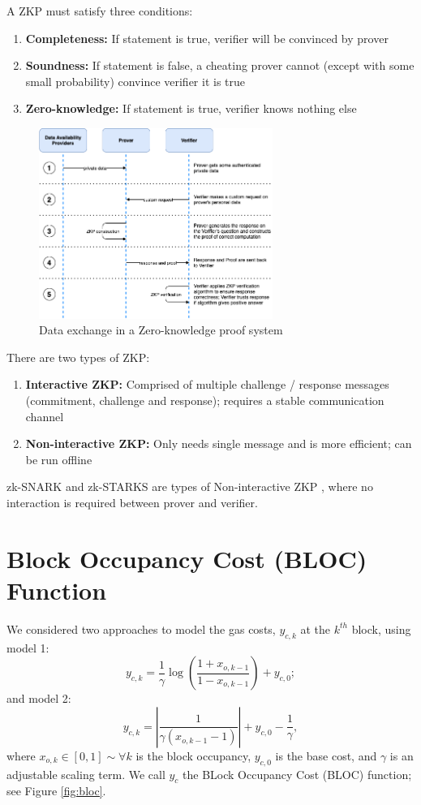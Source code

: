 \documentclass[peerreview]{ieeesyscoin}
\begin{document}
A ZKP must satisfy three conditions:

\begin{enumerate}
\item \textbf{Completeness:} If statement is true, verifier will be convinced by prover
\item\textbf{Soundness:} If statement is false, a cheating prover cannot (except with some small probability) convince verifier it is true
\item \textbf{Zero-knowledge:} If statement is true, verifier knows nothing else
\end{enumerate}

\begin{figure}[h!]
\includegraphics[width=3in]{img/zkp.png}
\caption{Data exchange in a Zero-knowledge proof system} 
\label{fig:zkp}
\end{figure} 

There are two types of ZKP:

\begin{enumerate}
\item \textbf{Interactive ZKP:} Comprised of multiple challenge / response messages (commitment, challenge and response); requires a stable communication channel
\item \textbf{Non-interactive ZKP:} Only needs single message and is more efficient; can be run offline
\end{enumerate}
zk-SNARK and zk-STARKS are types of Non-interactive ZKP , where no interaction is required between prover and verifier.

\section{Block Occupancy Cost (BLOC) Function}

We considered two approaches to model the gas costs, $y_{c,k}$ at the $k^{th}$ block, using model 1:
\begin{equation}
y_{c,k} = \dfrac{1}{\gamma}\log\left(\dfrac{1+x_{o,k-1}}{1-x_{o,k-1}}\right) + y_{c,0};
\end{equation}
and model 2:
\begin{equation}
y_{c,k} = \left| \dfrac{1}{\gamma(x_{o,k-1}-1)} \right| + y_{c,0} - \dfrac{1}{\gamma},
\end{equation}
where $x_{o,k} \in [0,1] \sim \forall k$ is the block occupancy, $y_{c,0}$ is the base cost, and $\gamma$ is an adjustable scaling term. We call $y_{c}$ the BLock Occupancy Cost (BLOC) function; see Figure \ref{fig:bloc}.
\end{document}

